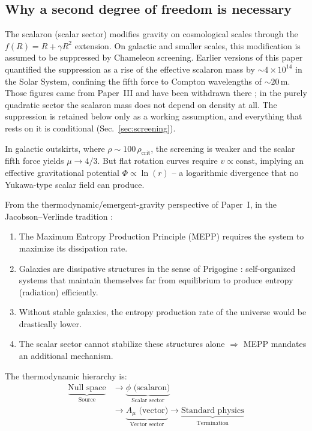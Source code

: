 \documentclass[aps,prd,twocolumn,superscriptaddress,nofootinbib]{revtex4-2}
\begin{document}
\subsection{Why a second degree of freedom is necessary}
\label{sec:why_vector}

The scalaron (scalar sector) modifies gravity on cosmological scales through the $f(R) = R + \gamma R^2$ extension. On galactic and smaller scales, this modification is assumed to be suppressed by Chameleon screening. Earlier versions of this paper quantified the suppression as a rise of the effective scalaron mass by $\sim 4 \times 10^{14}$ in the Solar System, confining the fifth force to Compton wavelengths of $\sim 20$\,m. Those figures came from Paper~III and have been withdrawn there \cite{Geiger2026c}; in the purely quadratic sector the scalaron mass does not depend on density at all. The suppression is retained below only as a working assumption, and everything that rests on it is conditional (Sec.~\ref{sec:screening}).

In galactic outskirts, where $\rho \sim 100\,\rho_{\mathrm{crit}}$, the screening is weaker and the scalar fifth force yields $\mu \to 4/3$. But flat rotation curves require $v \propto \mathrm{const}$, implying an effective gravitational potential $\Phi \propto \ln(r)$ -- a logarithmic divergence that no Yukawa-type scalar field can produce.

From the thermodynamic/emergent-gravity perspective of Paper~I, in the Jacobson--Verlinde tradition \cite{Jacobson1995,Verlinde2017}:
\begin{enumerate}
\item The Maximum Entropy Production Principle (MEPP) \cite{Dewar2003,Martyushev2006} requires the system to maximize its dissipation rate.
\item Galaxies are dissipative structures in the sense of Prigogine \cite{Prigogine1977}: self-organized systems that maintain themselves far from equilibrium to produce entropy (radiation) efficiently.
\item Without stable galaxies, the entropy production rate of the universe would be drastically lower.
\item The scalar sector cannot stabilize these structures alone $\Rightarrow$ MEPP mandates an additional mechanism.
\end{enumerate}

The thermodynamic hierarchy is:
\begin{equation}
\begin{split}
\underbrace{\text{Null space}}_{\text{Source}} &\to \underbrace{\phi \text{ (scalaron)}}_{\text{Scalar sector}} \\
&\to \underbrace{A_\mu \text{ (vector)}}_{\text{Vector sector}} \to \underbrace{\text{Standard physics}}_{\text{Termination}}
\end{split}
\label{eq:hierarchy}
\end{equation}
\end{document}
